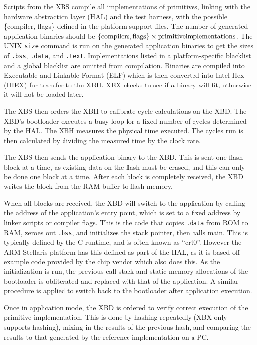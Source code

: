 \documentclass[twoside,11pt]{cergdoc}
\begin{document}
Scripts from the XBS compile all implementations of primitives, linking with
the hardware abstraction layer (HAL) and the test harness, with the possible
\{compiler, flags\} defined in the platform support files. The number of generated
application binaries should be $\{\rm{compilers,flags}\}\times\rm{primitive
implementations}$. The UNIX \texttt{size} command is run on the generated
application binaries to get the sizes of
\texttt{.bss}, \texttt{.data}, and \texttt{.text}. Implementations listed in a
platform-specific blacklist and a global blacklist are omitted from compilation.
Binaries are compiled into Executable and Linkable Format (ELF) which is then
converted into Intel Hex (IHEX) for transfer to the XBH. XBX checks to see if
a binary will fit, otherwise it will not be loaded later.

The XBS then orders the XBH to calibrate cycle calculations on the XBD. The
XBD's bootloader executes a busy loop for a fixed number of cycles determined by
the HAL. The XBH measures the physical time executed. The cycles run is then
calculated by dividing the measured time by the clock rate.

The XBS then sends the application binary to the XBD. This is sent one flash
block at a time, as existing data on the flash must be erased, and this can only
be done one block at a time. After each block is completely received, the XBD
writes the block from the RAM buffer to flash
memory. 

When all blocks are received, the XBD will switch to the application by
calling the address of the application's entry point, which is set to a fixed
address by linker scripts or compiler flags. This is the code
that copies \texttt{.data} from ROM to RAM, zeroes out \texttt{.bss}, and
initializes the stack pointer, then calls main. This is typically defined by the
C runtime, and is often known as ``crt0''. However the ARM Stellaris platform has
this defined as part of the HAL, as it is based off example code provided by the
chip vendor which also does this. As the initialization is run, the previous
call stack and static memory allocations of the bootloader is obliterated and
replaced with that of the application. A similar procedure is applied to switch
back to the bootloader after application execution. 

Once in application mode, the XBD is ordered to verify correct execution of the
primitive implementation. This is done by hashing repeatedly (XBX only supports hashing), mixing
in the results of the previous hash, and comparing the results to that generated
by the reference implementation on a PC. 
\end{document}
